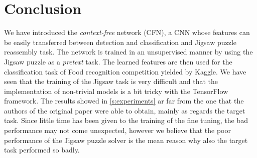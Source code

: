 \section{Conclusion}
We have introduced the \emph{context-free} network (CFN), a CNN whose features can be easily transferred between detection and classification and Jigsaw puzzle reassembly task. The network is trained in an unsupervised manner by using the Jigsaw puzzle as a \emph{pretext} task. The learned features are then used for the classification task of Food recognition competition yielded by Kaggle. We have seen that the training of the Jigsaw task is very difficult and that the implementation of non-trivial models is a bit tricky with the TensorFlow framework. The results showed in \ref{s:experiments} ar far from the one that the authors of the original paper were able to obtain, mainly as regards the target task. Since little time has been given to the training of the fine tuning, the bad performance may not come unexpected, however we believe that the poor performance of the Jigsaw puzzle solver is the mean reason why also the target task performed so badly.